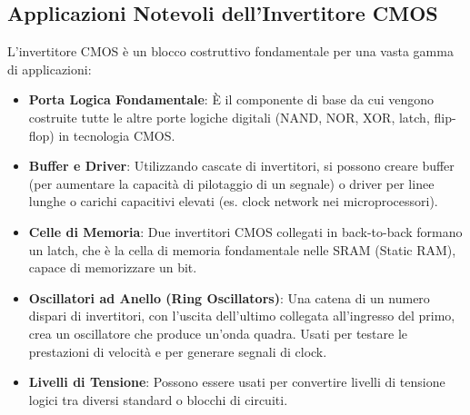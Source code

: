 \subsection{Applicazioni Notevoli dell'Invertitore CMOS}
L'invertitore CMOS è un blocco costruttivo fondamentale per una vasta gamma di applicazioni:
\begin{itemize}
    \item \textbf{Porta Logica Fondamentale}: È il componente di base da cui vengono costruite tutte le altre porte logiche digitali (NAND, NOR, XOR, latch, flip-flop) in tecnologia CMOS.
    \item \textbf{Buffer e Driver}: Utilizzando cascate di invertitori, si possono creare buffer (per aumentare la capacità di pilotaggio di un segnale) o driver per linee lunghe o carichi capacitivi elevati (es. clock network nei microprocessori).
    \item \textbf{Celle di Memoria}: Due invertitori CMOS collegati in back-to-back formano un latch, che è la cella di memoria fondamentale nelle SRAM (Static RAM), capace di memorizzare un bit.
    \item \textbf{Oscillatori ad Anello (Ring Oscillators)}: Una catena di un numero dispari di invertitori, con l'uscita dell'ultimo collegata all'ingresso del primo, crea un oscillatore che produce un'onda quadra. Usati per testare le prestazioni di velocità e per generare segnali di clock.
    \item \textbf{Livelli di Tensione}: Possono essere usati per convertire livelli di tensione logici tra diversi standard o blocchi di circuiti.
\end{itemize}
